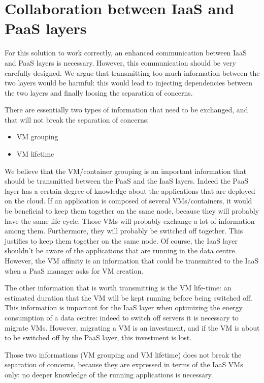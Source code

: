
\section{Collaboration between IaaS and PaaS layers}
\label{sec:iaaspaas}

For this solution to work correctly, an enhanced communication between IaaS and PaaS layers is necessary.
However, this communication should be very carefully designed.
We argue that transmitting too much information between the two layers would be harmful: this would lead to injecting dependencies between the two layers and finally loosing the separation of concerns. 

There are essentially two types of information that need to be exchanged, and that will not break the separation of concerns:
\begin{itemize}
  \item VM grouping
  \item VM lifetime
\end{itemize}

We believe that the VM/container grouping is an important information that should be transmitted between the PaaS and the IaaS layers.
Indeed the PaaS layer has a certain degree of knowledge about the applications that are deployed on the cloud.
If an application is composed of several VMs/containers, it would be beneficial to keep them together on the same node, because they will probably have the same life cycle.
Those VMs will probably exchange a lot of information among them. Furthermore, they will probably be switched off together.
This justifies to keep them together on the same node.
Of course, the IaaS layer shouldn't be aware of the applications that are running in the data centre.
However, the VM affinity is an information that could be transmitted to the IaaS when a PaaS manager asks for VM creation.

The other information that is worth transmitting is the VM life-time: an estimated duration that the VM will be kept running before being switched off.
This information is important for the IaaS layer when optimizing the energy consumption of a data centre: indeed to switch off servers it is necessary to migrate VMs. 
However, migrating a VM is an investment, and if the VM is about to be switched off by the PaaS layer, this investment is lost.

Those two informations (VM grouping and VM lifetime) does not break the separation of concerns, because they are expressed in terms of the IaaS VMs only: no deeper knowledge of the running applications is necessary.
